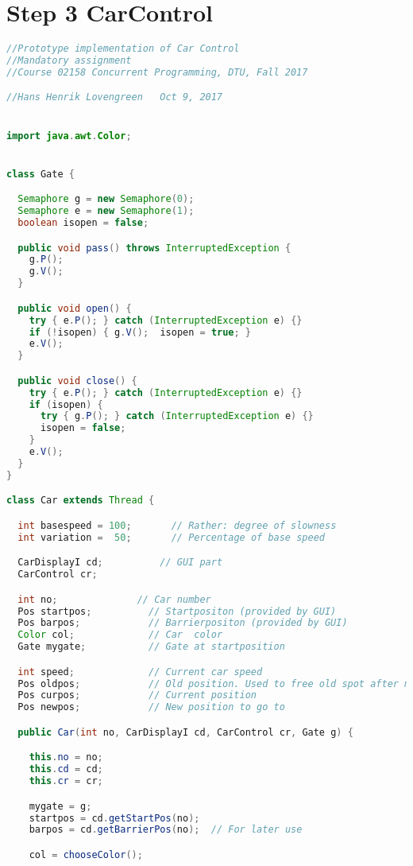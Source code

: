 \section*{Step 3 CarControl}
\begin{lstlisting}[language=java]
//Prototype implementation of Car Control
//Mandatory assignment
//Course 02158 Concurrent Programming, DTU, Fall 2017

//Hans Henrik Lovengreen   Oct 9, 2017


import java.awt.Color;


class Gate {

  Semaphore g = new Semaphore(0);
  Semaphore e = new Semaphore(1);
  boolean isopen = false;

  public void pass() throws InterruptedException {
    g.P(); 
    g.V();
  }

  public void open() {
    try { e.P(); } catch (InterruptedException e) {}
    if (!isopen) { g.V();  isopen = true; }
    e.V();
  }

  public void close() {
    try { e.P(); } catch (InterruptedException e) {}
    if (isopen) { 
      try { g.P(); } catch (InterruptedException e) {}
      isopen = false;
    }
    e.V();
  }
}

class Car extends Thread {

  int basespeed = 100;       // Rather: degree of slowness
  int variation =  50;       // Percentage of base speed

  CarDisplayI cd;          // GUI part
  CarControl cr;

  int no;              // Car number
  Pos startpos;          // Startpositon (provided by GUI)
  Pos barpos;            // Barrierpositon (provided by GUI)
  Color col;             // Car  color
  Gate mygate;           // Gate at startposition

  int speed;             // Current car speed
  Pos oldpos;            // Old position. Used to free old spot after move.
  Pos curpos;            // Current position 
  Pos newpos;            // New position to go to

  public Car(int no, CarDisplayI cd, CarControl cr, Gate g) {

    this.no = no;
    this.cd = cd;
    this.cr = cr;

    mygate = g;
    startpos = cd.getStartPos(no);
    barpos = cd.getBarrierPos(no);  // For later use

    col = chooseColor();


\end{lstlisting}
